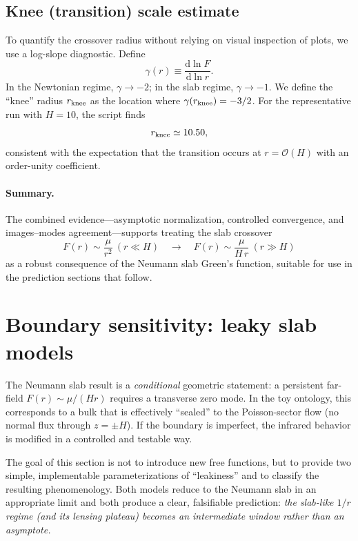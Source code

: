 \documentclass[11pt]{article}
\newcommand{\dd}{\mathrm{d}}
\begin{document}
\subsection{Knee (transition) scale estimate}
\label{sec:numerics_knee}

To quantify the crossover radius without relying on visual inspection of plots, we use a log-slope
diagnostic.  Define
\begin{equation}
  \gamma(r)\equiv \frac{\dd \ln F}{\dd \ln r}.
\end{equation}
In the Newtonian regime, $\gamma\to -2$; in the slab regime, $\gamma\to -1$.
We define the ``knee'' radius $r_{\rm knee}$ as the location where $\gamma(r_{\rm knee})=-3/2$.
For the representative run with $H=10$, the script finds
\begin{equation}
  r_{\rm knee}\simeq 10.50,
\end{equation}
consistent with the expectation that the transition occurs at $r=\mathcal{O}(H)$ with an order-unity
coefficient.

\paragraph{Summary.}
The combined evidence---asymptotic normalization, controlled convergence, and images--modes
agreement---supports treating the slab crossover
\begin{equation}
  F(r)\sim \frac{\mu}{r^2}\ (r\ll H)
  \quad\longrightarrow\quad
  F(r)\sim \frac{\mu}{H\,r}\ (r\gg H)
\end{equation}
as a robust consequence of the Neumann slab Green's function, suitable for use in the prediction
sections that follow.

\section{Boundary sensitivity: leaky slab models}
\label{sec:leaky}

The Neumann slab result is a \emph{conditional} geometric statement:
a persistent far-field $F(r)\sim \mu/(Hr)$ requires a transverse zero mode.
In the toy ontology, this corresponds to a bulk that is effectively ``sealed'' to the Poisson-sector
flow (no normal flux through $z=\pm H$).  If the boundary is imperfect, the infrared behavior is
modified in a controlled and testable way.

The goal of this section is not to introduce new free functions, but to provide two simple,
implementable parameterizations of ``leakiness'' and to classify the resulting phenomenology.
Both models reduce to the Neumann slab in an appropriate limit and both produce a clear,
falsifiable prediction: \emph{the slab-like $1/r$ regime (and its lensing plateau) becomes an
intermediate window rather than an asymptote.}
\end{document}
